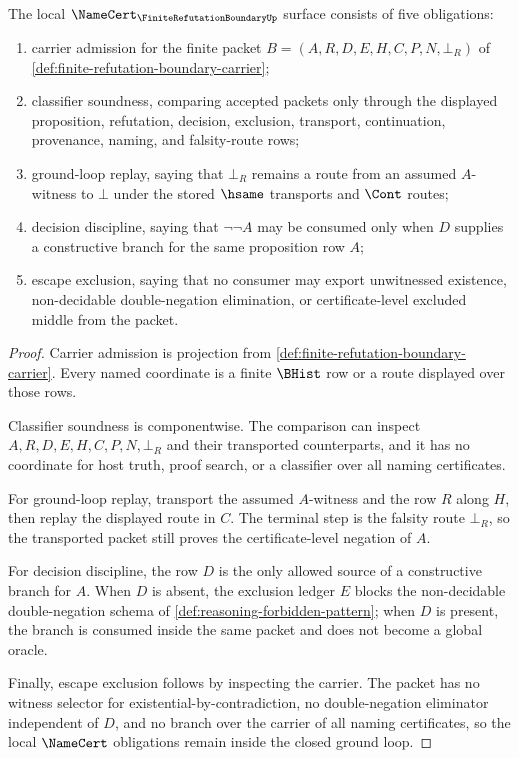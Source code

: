 \begin{theorem}
\label{thm:finite-refutation-boundary-namecert-obligations}
The local $\NameCert_{\FiniteRefutationBoundaryUp}$ surface consists of five obligations:
\begin{enumerate}
\item carrier admission for the finite packet $B=(A,R,D,E,H,C,P,N,\bot_R)$ of \autoref{def:finite-refutation-boundary-carrier};
\item classifier soundness, comparing accepted packets only through the displayed proposition, refutation, decision, exclusion, transport, continuation, provenance, naming, and falsity-route rows;
\item ground-loop replay, saying that $\bot_R$ remains a route from an assumed $A$-witness to $\bot$ under the stored $\hsame$ transports and $\Cont$ routes;
\item decision discipline, saying that $\neg\neg A$ may be consumed only when $D$ supplies a constructive branch for the same proposition row $A$;
\item escape exclusion, saying that no consumer may export unwitnessed existence, non-decidable double-negation elimination, or certificate-level excluded middle from the packet.
\end{enumerate}
\end{theorem}
\begin{proof}
Carrier admission is projection from \autoref{def:finite-refutation-boundary-carrier}. Every named coordinate is a finite $\BHist$ row or a route displayed over those rows.

Classifier soundness is componentwise. The comparison can inspect $A,R,D,E,H,C,P,N,\bot_R$ and their transported counterparts, and it has no coordinate for host truth, proof search, or a classifier over all naming certificates.

For ground-loop replay, transport the assumed $A$-witness and the row $R$ along $H$, then replay the displayed route in $C$. The terminal step is the falsity route $\bot_R$, so the transported packet still proves the certificate-level negation of $A$.

For decision discipline, the row $D$ is the only allowed source of a constructive branch for $A$. When $D$ is absent, the exclusion ledger $E$ blocks the non-decidable double-negation schema of \autoref{def:reasoning-forbidden-pattern}; when $D$ is present, the branch is consumed inside the same packet and does not become a global oracle.

Finally, escape exclusion follows by inspecting the carrier. The packet has no witness selector for existential-by-contradiction, no double-negation eliminator independent of $D$, and no branch over the carrier of all naming certificates, so the local $\NameCert$ obligations remain inside the closed ground loop.
\end{proof}

